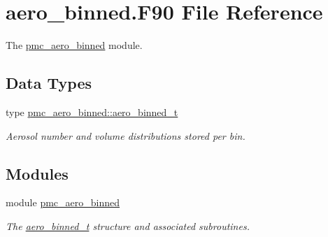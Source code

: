 \hypertarget{aero__binned_8_f90}{}\section{aero\+\_\+binned.\+F90 File Reference}
\label{aero__binned_8_f90}


The \mbox{\hyperlink{namespacepmc__aero__binned}{pmc\+\_\+aero\+\_\+binned}} module.  


\subsection*{Data Types}
\begin{DoxyCompactItemize}
\item 
type \mbox{\hyperlink{structpmc__aero__binned_1_1aero__binned__t}{pmc\+\_\+aero\+\_\+binned\+::aero\+\_\+binned\+\_\+t}}
\begin{DoxyCompactList}\small\item\em Aerosol number and volume distributions stored per bin. \end{DoxyCompactList}\end{DoxyCompactItemize}
\subsection*{Modules}
\begin{DoxyCompactItemize}
\item 
module \mbox{\hyperlink{namespacepmc__aero__binned}{pmc\+\_\+aero\+\_\+binned}}
\begin{DoxyCompactList}\small\item\em The \mbox{\hyperlink{structpmc__aero__binned_1_1aero__binned__t}{aero\+\_\+binned\+\_\+t}} structure and associated subroutines. \end{DoxyCompactList}\end{DoxyCompactItemize}
